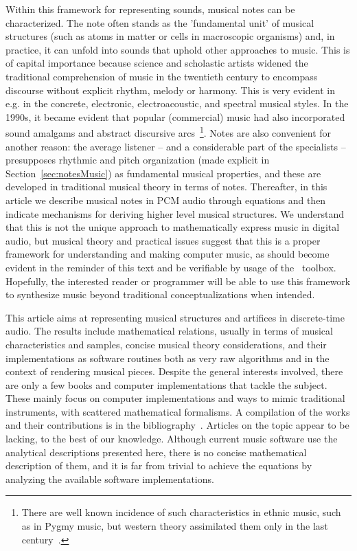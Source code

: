 Within this framework for representing sounds,
musical notes can be characterized.
The note often stands as the 'fundamental unit' of musical structures
(such as atoms in matter or cells in macroscopic organisms) and,
in practice, it can unfold into sounds that uphold other approaches to music.
This is of capital importance because science and scholastic artists
widened the traditional comprehension of music in the twentieth century
to encompass discourse without explicit rhythm, melody or harmony.
This is very evident in e.g. in the concrete, electronic, electroacoustic,
and spectral musical styles.
In the 1990s, it became evident that popular
(commercial) music had also incorporated
sound amalgams and abstract discursive arcs~\footnote{There
are well known incidence of such characteristics in ethnic music,
such as in Pygmy music, but western theory assimilated them
only in the last century~\cite{Wisnick}.}.
Notes are also convenient for another reason:
the average listener -- and a considerable part of the specialists --
presupposes rhythmic and pitch organization 
(made explicit in Section~\ref{sec:notesMusic})
as fundamental musical properties,
and these are developed in traditional musical theory in terms of notes.
Thereafter, in this article we describe musical notes in PCM audio through equations
and then indicate mechanisms for deriving higher level musical structures.
We understand that this is not the unique approach to mathematically express music in
digital audio, but musical theory and practical issues suggest that
this is a proper framework for understanding and making computer music,
as should become evident in the reminder of this text and be verifiable
by usage of the \massa\ toolbox.
Hopefully, the interested reader or programmer will be able to use
this framework to synthesize music beyond traditional conceptualizations when intended.

This article aims at representing musical structures and artifices
in discrete-time audio.
The results include mathematical relations,
usually in terms of musical characteristics and samples,
concise musical theory considerations,
and their implementations as software routines both as
very raw algorithms and in the context of rendering musical pieces.
Despite the general interests involved,
there are only a few books and computer implementations that tackle the subject.
These mainly focus on computer implementations and ways to mimic traditional instruments,
with scattered mathematical formalisms.
A compilation of the works and their contributions is in the bibliography~\cite{dissertacao}.
Articles on the topic appear to be lacking, to the best of our knowledge.
Although current music software use the analytical descriptions presented here,
there is no concise mathematical description of them, and it is far from trivial
to achieve the equations by analyzing the available software implementations.

